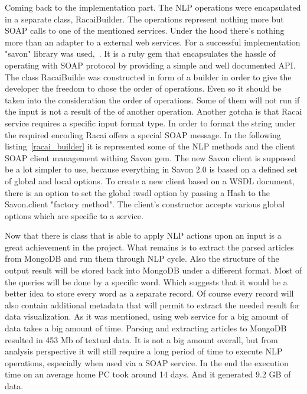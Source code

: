 Coming back to the implementation part. The NLP operations were encapsulated in a separate class, RacaiBuilder. The operations represent nothing more but SOAP calls to one of the mentioned services. Under the hood there's nothing more than an adapter to a external web services. For a successful implementation "savon" library was \mbox{used, \cite{savon_gem}}. It is a ruby gem that encapsulates the hassle of operating with SOAP protocol by providing a simple and well documented API. The class RacaiBuilde was constructed in form of a builder in order to give the developer the freedom to chose the order of operations. Even so it should be taken into the consideration the order of operations. Some of them will not run if the input is not a result of the of another operation. Another gotcha is that Racai service requires a specific input format type. In order to format the string under the required encoding Racai offers a special SOAP message. In the following \mbox{listing \ref{racai_builder}} it is represented some of the NLP methods and the client SOAP client management withing Savon gem. The new Savon client is supposed be a lot simpler to use, because everything in Savon 2.0 is based on a defined set of global and local options. To create a new client based on a WSDL document, there is an option to set the global :wsdl option by passing a Hash to the Savon.client "factory method". The client's constructor accepts various global options which are specific to a service.



Now that there is class that is able to apply NLP actions upon an input is a great achievement in the project. What remains is to extract the parsed articles from MongoDB and run them through NLP cycle. Also the structure of the output result will be stored back into MongoDB under a different format. Most of the queries will be done by a specific word. Which suggests that it would be a better idea to store every word as a separate record. Of course every record will also contain additional metadata that will permit to extract the needed result for data visualization. As it was mentioned, using web service for a big amount of data takes a big amount of time. Parsing and extracting articles to MongoDB resulted in 453 Mb of textual data. It is not a big amount overall, but from analysis perspective it will still require a long period of time to execute NLP operations, especially when used via a SOAP service. In the end the execution time on an average home PC took around 14 days. And it generated 9.2 GB of data.

